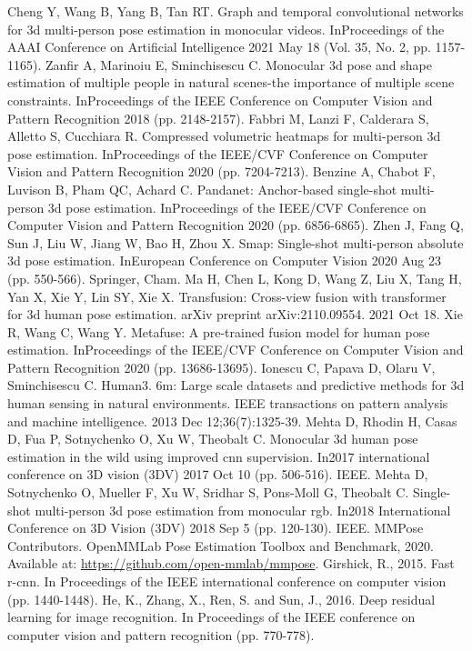 \documentclass[runningheads]{llncs}
\begin{document}
\begin{thebibliography}{8}
   Cheng Y, Wang B, Yang B, Tan RT. Graph and temporal convolutional networks for 3d multi-person pose estimation in monocular videos. InProceedings of the AAAI Conference on Artificial Intelligence 2021 May 18 (Vol. 35, No. 2, pp. 1157-1165).
   Zanfir A, Marinoiu E, Sminchisescu C. Monocular 3d pose and shape estimation of multiple people in natural scenes-the importance of multiple scene constraints. InProceedings of the IEEE Conference on Computer Vision and Pattern Recognition 2018 (pp. 2148-2157).
   Fabbri M, Lanzi F, Calderara S, Alletto S, Cucchiara R. Compressed volumetric heatmaps for multi-person 3d pose estimation. InProceedings of the IEEE/CVF Conference on Computer Vision and Pattern Recognition 2020 (pp. 7204-7213).
   Benzine A, Chabot F, Luvison B, Pham QC, Achard C. Pandanet: Anchor-based single-shot multi-person 3d pose estimation. InProceedings of the IEEE/CVF Conference on Computer Vision and Pattern Recognition 2020 (pp. 6856-6865).
   Zhen J, Fang Q, Sun J, Liu W, Jiang W, Bao H, Zhou X. Smap: Single-shot multi-person absolute 3d pose estimation. InEuropean Conference on Computer Vision 2020 Aug 23 (pp. 550-566). Springer, Cham.
   Ma H, Chen L, Kong D, Wang Z, Liu X, Tang H, Yan X, Xie Y, Lin SY, Xie X. Transfusion: Cross-view fusion with transformer for 3d human pose estimation. arXiv preprint arXiv:2110.09554. 2021 Oct 18.
   Xie R, Wang C, Wang Y. Metafuse: A pre-trained fusion model for human pose estimation. InProceedings of the IEEE/CVF Conference on Computer Vision and Pattern Recognition 2020 (pp. 13686-13695).
   Ionescu C, Papava D, Olaru V, Sminchisescu C. Human3. 6m: Large scale datasets and predictive methods for 3d human sensing in natural environments. IEEE transactions on pattern analysis and machine intelligence. 2013 Dec 12;36(7):1325-39.
   Mehta D, Rhodin H, Casas D, Fua P, Sotnychenko O, Xu W, Theobalt C. Monocular 3d human pose estimation in the wild using improved cnn supervision. In2017 international conference on 3D vision (3DV) 2017 Oct 10 (pp. 506-516). IEEE.
   Mehta D, Sotnychenko O, Mueller F, Xu W, Sridhar S, Pons-Moll G, Theobalt C. Single-shot multi-person 3d pose estimation from monocular rgb. In2018 International Conference on 3D Vision (3DV) 2018 Sep 5 (pp. 120-130). IEEE.
   MMPose Contributors. OpenMMLab Pose Estimation Toolbox and Benchmark, 2020. Available at: \url{https://github.com/open-mmlab/mmpose}.
   Girshick, R., 2015. Fast r-cnn. In Proceedings of the IEEE international conference on computer vision (pp. 1440-1448).
   He, K., Zhang, X., Ren, S. and Sun, J., 2016. Deep residual learning for image recognition. In Proceedings of the IEEE conference on computer vision and pattern recognition (pp. 770-778).



\end{thebibliography}
\end{document}
